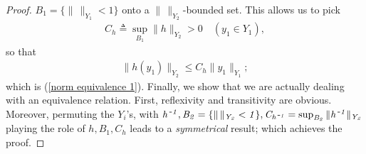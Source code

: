 \begin{proof}
%
  $B_1 = \{ \| \, \|_{Y_1} < 1 \}$ onto %
%
a $\|\,\|_{Y_2}$-bounded set. %
%
This allows us to pick %
%
\begin{align}
  C_h \triangleq \sup_{B_1} \| h \|_{Y_2} > 0 \quad(y_1 \in Y_1), 
\end{align}
%
so that %
%
\begin{align}\label{norm equivalence 2}
  \|h(y_1)\|_{Y_{2}} \leq C_h \|y_1\|_{Y_{1}}; 
\end{align}
%
which is (\ref{norm equivalence 1}). %
%
Finally, we show that we are actually dealing with an equivalence relation. %
First, reflexivity and transitivity are obvious. Moreover, 
permuting the $\mathit{Y}_i$'s, with %
%
  $\mathit{%
  h^{\, \minus 1}, 
  B_2 = \{\| \, \|_{Y_2} < 1 \}, 
  C_{h^{\, \minus 1}} = \sup_{B_2} \| h^{\, \minus 1}\|_{Y_2}
  }$
%
playing the role of $\mathit{h}, \mathit{B_1}, \mathit{C_h}$ %
leads to a \textit{symmetrical} result; which achieves the proof.
\end{proof}

